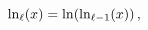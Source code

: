 $\mathop{\ln\/}\nolimits_{\ell}(x)=\mathop{\ln\/}\nolimits\!\left(\mathop{\ln\/%
}\nolimits_{\ell-1}(x)\right),$